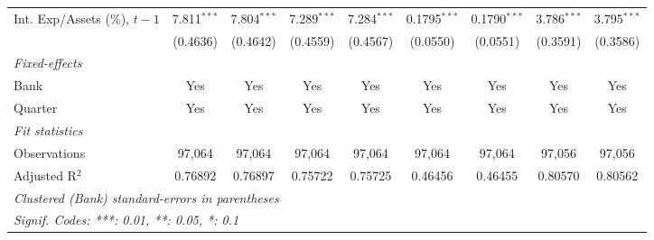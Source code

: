 \begin{tabular}{lcccccccc}
   Int. Exp/Assets (\%), $t{-}1$  & 7.811$^{***}$ & 7.804$^{***}$ & 7.289$^{***}$ & 7.284$^{***}$ & 0.1795$^{***}$  & 0.1790$^{***}$  & 3.786$^{***}$  & 3.795$^{***}$\\   
                                  & (0.4636)      & (0.4642)      & (0.4559)      & (0.4567)      & (0.0550)        & (0.0551)        & (0.3591)       & (0.3586)\\   
   \midrule
   \emph{Fixed-effects}\\
   Bank                           & Yes           & Yes           & Yes           & Yes           & Yes             & Yes             & Yes            & Yes\\  
   Quarter                        & Yes           & Yes           & Yes           & Yes           & Yes             & Yes             & Yes            & Yes\\  
   \midrule
   \emph{Fit statistics}\\
   Observations                   & 97,064        & 97,064        & 97,064        & 97,064        & 97,064          & 97,064          & 97,056         & 97,056\\  
   Adjusted R$^2$                 & 0.76892       & 0.76897       & 0.75722       & 0.75725       & 0.46456         & 0.46455         & 0.80570        & 0.80562\\  
   \midrule \midrule
   \multicolumn{9}{l}{\emph{Clustered (Bank) standard-errors in parentheses}}\\
   \multicolumn{9}{l}{\emph{Signif. Codes: ***: 0.01, **: 0.05, *: 0.1}}\\
\end{tabular}
\par\endgroup


